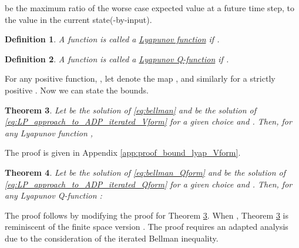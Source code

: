 \documentclass[journal]{IEEEtran}
\newtheorem{theorem}{Theorem}[section]
\newtheorem{definition}[theorem]{Definition}
\newcommand{\textQ}{Q}
\begin{document}
be the maximum ratio of the worse case expected value at a future time step, to the value in the current state(-by-input).


\vspace{0.1cm}

\begin{definition} \label{def:lyap_func_Vform}
	A function  is called a \underline{\emph{Lyapunov function}} if .
\end{definition}

\vspace{0.1cm}

\begin{definition} \label{def:lyap_func_Qform}
	A function  is called a \underline{\emph{Lyapunov \textQ-function}} if .
\end{definition}

\vspace{0.1cm}

For any positive function, , let  denote the map , and similarly for a strictly positive . Now we can state the bounds.

\vspace{0.1cm}

\begin{theorem} \label{theorem:bound_lyapunov_iterated_Vform}
	Let  be the solution of \eqref{eq:bellman} and  be the solution of \eqref{eq:LP_approach_to_ADP_iterated_Vform} for a given choice  and . Then, for any Lyapunov function ,
	
\end{theorem}
\vspace{0.1cm}
The proof is given in Appendix \ref{app:proof_bound_lyap_Vform}.


\vspace{0.1cm}

\begin{theorem} \label{theorem:bound_lyapunov_iterated_Qform}
	Let  be the solution of \eqref{eq:bellman_Qform} and  be the solution of \eqref{eq:LP_approach_to_ADP_iterated_Qform} for a given choice  and . Then, for any Lyapunov \textQ-function :
	
\end{theorem}
\vspace{0.1cm}
The proof follows by modifying the proof for Theorem \ref{theorem:bound_lyapunov_iterated_Vform}.
When , Theorem \ref{theorem:bound_lyapunov_iterated_Vform} is reminiscent of the finite space version \cite[Theorem 3]{vanRoy_linApproxDP}. The proof requires an adapted analysis due to the consideration of the iterated Bellman inequality.
\end{document}
